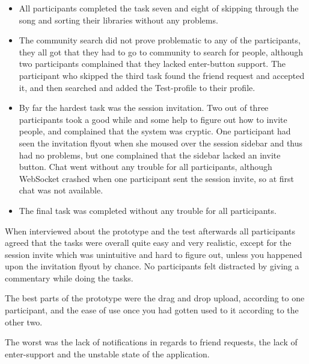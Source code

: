 \begin{itemize}
	\item All participants completed the task seven and eight of skipping through the song and sorting their libraries without any problems.
	\item The community search did not prove problematic to any of the participants, they all got that they had to go to community to search for people, although two participants complained that they lacked enter-button support. The participant who skipped the third task found the friend request and accepted it, and then searched and added the Test-profile to their profile.
	\item By far the hardest task was the session invitation. Two out of three participants took a good while and some help to figure out how to invite people, and complained that the system was cryptic. One participant had seen the invitation flyout when she moused over the session sidebar and thus had no problems, but one complained that the sidebar lacked an invite button. Chat went without any trouble for all participants, although WebSocket crashed when one participant sent the session invite, so at first chat was not available.
	\item The final task was completed without any trouble for all participants.
\end{itemize}

When interviewed about the prototype and the test afterwards all participants agreed that the tasks were overall quite easy and very realistic, except for the session invite which was unintuitive and hard to figure out, unless you happened upon the invitation flyout by chance. No participants felt distracted by giving a commentary while doing the tasks. 

The best parts of the prototype were the drag and drop upload, according to one participant, and the ease of use once you had gotten used to it according to the other two. 

The worst was the lack of notifications in regards to friend requests, the lack of enter-support and the unstable state of the application.